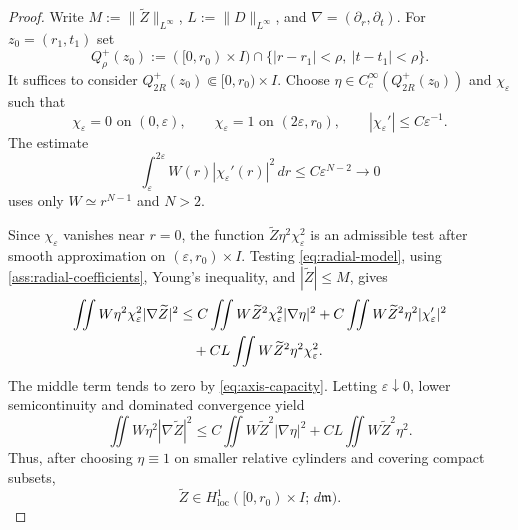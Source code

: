 \documentclass[11pt]{amsart}
\newcommand{\dd}{\,d}
\newcommand{\loc}{\mathrm{loc}}
\begin{document}
\begin{proof}
Write \(M:=\|\widetilde Z\|_{L^\infty}\), \(L:=\|D\|_{L^\infty}\), and
\(\nabla=(\partial_r,\partial_t)\). For \(z_0=(r_1,t_1)\) set
\[
        Q_\rho^+(z_0):=([0,r_0)\times I)
        \cap\{|r-r_1|<\rho,\ |t-t_1|<\rho\}.
\]
It suffices to consider \(Q_{2R}^+(z_0)\Subset[0,r_0)\times I\).
Choose
\(\eta\in C_c^\infty(Q_{2R}^+(z_0))\) and
\(\chi_\varepsilon\) such that
\[
        \chi_\varepsilon=0\text{ on }(0,\varepsilon),\qquad
        \chi_\varepsilon=1\text{ on }(2\varepsilon,r_0),\qquad
        |\chi_\varepsilon'|\le C\varepsilon^{-1}.
\]
The estimate
\begin{equation}
\label{eq:axis-capacity}
        \int_\varepsilon^{2\varepsilon}W(r)|\chi_\varepsilon'(r)|^2\,dr
        \le C\varepsilon^{N-2}\to0
\end{equation}
uses only \(W\simeq r^{N-1}\) and \(N>2\).

Since \(\chi_\varepsilon\) vanishes near \(r=0\), the function
\(\widetilde Z\eta^2\chi_\varepsilon^2\) is an admissible test after smooth
approximation on \((\varepsilon,r_0)\times I\). Testing
\eqref{eq:radial-model}, using \eqref{ass:radial-coefficients}, Young's
inequality, and \(|\widetilde Z|\le M\), gives
\begin{align}
\label{eq:caccioppoli-eps}
        \iint W\eta^2\chi_\varepsilon^2|\nabla \widetilde Z|^2
        &\le
        C\iint W\widetilde Z^2\chi_\varepsilon^2|\nabla\eta|^2
        +C\iint W\widetilde Z^2\eta^2|\chi_\varepsilon'|^2       \notag\\
        &\quad
        +CL\iint W\widetilde Z^2\eta^2\chi_\varepsilon^2 .
\end{align}
The middle term tends to zero by \eqref{eq:axis-capacity}. Letting
\(\varepsilon\downarrow0\), lower semicontinuity and dominated convergence
yield
\begin{equation}
\label{eq:caccioppoli}
        \iint W\eta^2|\nabla \widetilde Z|^2
        \le
        C\iint W\widetilde Z^2|\nabla\eta|^2
        +CL\iint W\widetilde Z^2\eta^2 .
\end{equation}
Thus, after choosing \(\eta\equiv1\) on smaller relative cylinders and
covering compact subsets,
\begin{equation}
\label{eq:finite-energy-axis}
        \widetilde Z\in H^1_{\loc}([0,r_0)\times I;\dd\mathfrak m).
\end{equation}


\end{proof}
\end{document}
